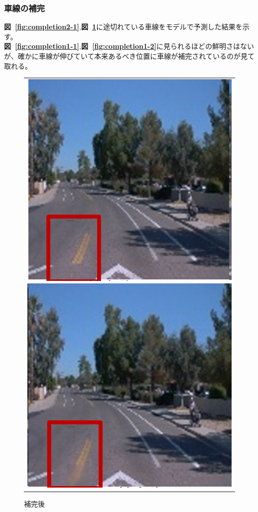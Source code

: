 \documentclass[a4j, 11pt]{jreport}
\newcommand{\figref}[1]{\textbf{図~\ref{#1}}}
\begin{document}
\subsubsection{車線の補完}
\figref{fig:completion2-1},\figref{fig:completion2-2}に途切れている車線をモデルで予測した結果を示す。\\
\figref{fig:completion1-1},\figref{fig:completion1-2}に見られるほどの鮮明さはないが、確かに車線が伸びていて本来あるべき位置に車線が補完されているのが見て取れる。
\begin{figure}[H]
	\centering
	  \begin{tabular}{c}
		\begin{minipage}{0.50\hsize}
		  \centering
			\includegraphics[scale=0.5]
			{images/result/completion/result2-1.png}
			\caption{補完前}
			\label{fig:completion2-1}
		\end{minipage}
   
   
		\begin{minipage}{0.50\hsize}
		  \centering
			\includegraphics[scale=0.5]
			{images/result/completion/result2-2.png}
			\caption{補完後}
			\label{fig:completion2-2}
		\end{minipage} \\
	\end{tabular}
\end{figure}
\end{document}
